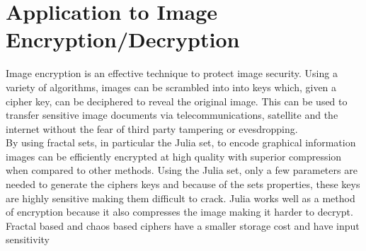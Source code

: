 \documentclass[12pt]{article}
\begin{document}
\section{Application to Image Encryption/Decryption}
{\parindent0pt
Image encryption is an effective technique to protect image security. Using a variety of algorithms, images can be scrambled into into keys which, given a cipher key, can be deciphered to reveal the original image. This can be used to transfer sensitive image documents via telecommunications, satellite and the internet without the fear of third party tampering or evesdropping. \\

By using fractal sets, in particular the Julia set, to encode graphical information images can be efficiently encrypted at high quality with superior compression when compared to other methods.\cite{cotty} Using the Julia set, only a few parameters are needed to generate the ciphers keys \cite{algo} and because of the sets properties, these keys are highly sensitive making them difficult to crack. Julia works well as a method of encryption because it also compresses the image \cite{china} making it harder to decrypt. Fractal based and chaos based ciphers have a smaller storage cost and have input sensitivity \cite{china}
}
\end{document}
